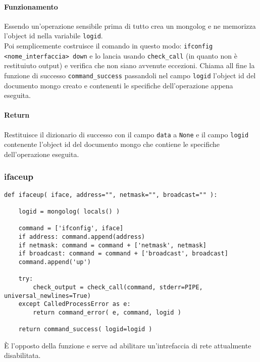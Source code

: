 \documentclass[11pt]{article}
\begin{document}
\paragraph{Funzionamento}
Essendo un'operazione sensibile prima di tutto crea un mongolog e ne memorizza l'object id nella variabile \texttt{logid}.\\
Poi semplicemente costruisce il comando in questo modo: \texttt{ifconfig <nome\_interfaccia> down} e lo lancia usando 
\texttt{check\_call} (in quanto non è restituiuto output) e verifica che non siano avvenute eccezioni. Chiama all fine
la funzione di successo \texttt{command\_success} passandoli nel campo \texttt{logid} l'object id del documento mongo
creato e contenenti le specifiche dell'operazione appena eseguita.
\paragraph{Return}
Restituisce il dizionario di successo con il campo \texttt{data} a \texttt{None} e il campo \texttt{logid} contenente
l'object id del documento mongo che contiene le specifiche dell'operazione eseguita.

\subsubsection{ifaceup}\label{ifaceup}
\begin{lstlisting}
def ifaceup( iface, address="", netmask="", broadcast="" ):
    
    logid = mongolog( locals() )    

    command = ['ifconfig', iface]
    if address: command.append(address)
    if netmask: command = command + ['netmask', netmask]
    if broadcast: command = command + ['broadcast', broadcast]
    command.append('up')

    try:
        check_output = check_call(command, stderr=PIPE, universal_newlines=True)
    except CalledProcessError as e:
        return command_error( e, command, logid )

    return command_success( logid=logid )
\end{lstlisting}
È l'opposto della funzione  e serve ad abilitare un'intrefaccia di rete attualmente disabilitata.
\end{document}
